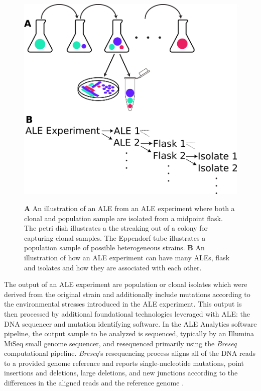 \documentclass[12pt,final,masters,chapterheads]{ucsd}  %
\begin{document}
\begin{figure}[h!]
  \caption{\textbf{A} An illustration of an ALE from an ALE experiment where both a clonal and population sample are isolated from a midpoint flask. The petri dish illustrates a the streaking out of a colony for capturing clonal samples. The Eppendorf tube illustrates a population sample of possible heterogeneous strains. \textbf{B} An illustration of how an ALE experiment can have many ALEs, flask and isolates and how they are associated with each other.}
  \centering
  \includegraphics[width=1\textwidth]{ale_experiment_samples.png}
  \label{fig:ale_experiment_samples}
\end{figure}

%
%

The output of an ALE experiment are population or clonal isolates which were derived from the original strain and additionally include mutations according to the environmental stresses introduced in the ALE experiment. This output is then processed by additional foundational technologies leveraged with ALE: the DNA sequencer and mutation identifying software. In the ALE Analytics software pipeline, the output sample to be analyzed is sequenced, typically by an Illumina MiSeq small genome sequencer, and resequenced primarily using the \textit{Breseq} computational pipeline. \textit{Breseq}'s resequencing process aligns all of the DNA reads to a provided genome reference and reports single-nucleotide mutations, point insertions and deletions, large deletions, and new junctions according to the differences in the aligned reads and the reference genome \cite{breseq_paper}.
\end{document}

